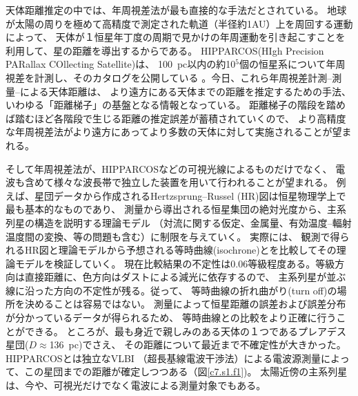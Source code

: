 天体距離推定の中では、年周視差法が最も直接的な手法だとされている。
地球が太陽の周りを極めて高精度で測定された軌道（半径約1AU）上を周回する運動によって、
天体が１恒星年丁度の周期で見かけの年周運動を引き起こすことを利用して、星の距離を導出するからである。
HIPPARCOS(HIgh Precision PARallax COllecting Satellite)は、
100~pc以内の約10$^{5}$個の恒星系について年周視差を計測し、そのカタログを公開している
\citep{1997A&A...323L..49P} 。今日、これら年周視差計測--測量--による天体距離は、
より遠方にある天体までの距離を推定するための手法、いわゆる「距離梯子」の基盤となる情報となっている。
距離梯子の階段を踏めば踏むほど各階段で生じる距離の推定誤差が蓄積されていくので、
より高精度な年周視差法がより遠方にあってより多数の天体に対して実施されることが望まれる。

そして年周視差法が、HIPPARCOSなどの可視光線によるものだけでなく、
電波も含めて様々な波長帯で独立した装置を用いて行われることが望まれる。
例えば、星団データから作成されるHertzsprung--Russel (HR)図は恒星物理学上で最も基本的なものであり、
測量から導出される恒星集団の絶対光度から、主系列星の構造を説明する理論モデル
（対流に関する仮定、金属量、有効温度--輻射温度間の変換、等の問題も含む）に制限を与えていく。
実際には、
観測で得られるHR図と理論モデルから予想される等時曲線(isochrone)とを比較してその理論モデルを検証していく。
現在比較結果の不定性は0.06等級程度ある。等級方向は直接距離に、色方向はダストによる減光に依存するので、
主系列星が並ぶ線に沿った方向の不定性が残る。従って、
等時曲線の折れ曲がり(turn off)の場所を決めることは容易ではない。
測量によって恒星距離の誤差および誤差分布が分かっているデータが得られるため、
等時曲線との比較をより正確に行うことができる\citep{2009Perryman}。
ところが、最も身近で親しみのある天体の１つであるプレアデス星団($D\approx$136~pc)でさえ、
その距離について最近まで不確定性が大きかった。HIPPARCOSとは独立なVLBI
（超長基線電波干渉法）による電波源測量によって、この星団までの距離が確定しつつある（図\ref{c7.s1.f1})。
太陽近傍の主系列星は、今や、可視光だけでなく電波による測量対象でもある。

